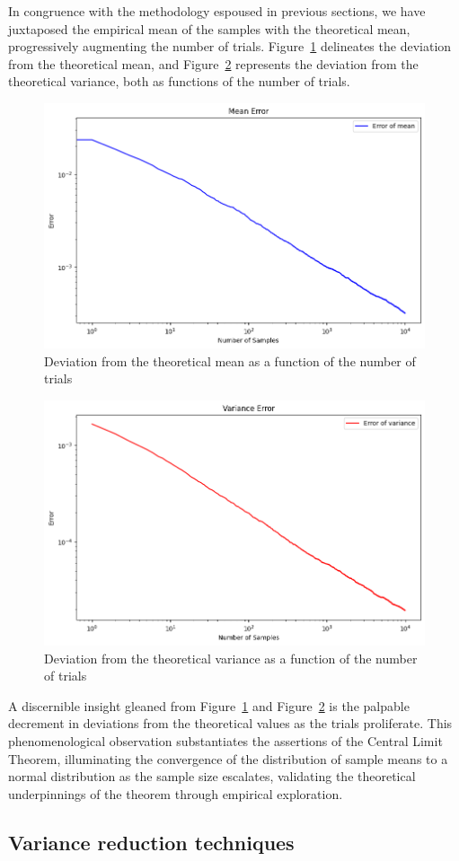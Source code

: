 \documentclass{article}
\begin{document}
In congruence with the methodology espoused in previous sections, we have juxtaposed the empirical mean of the samples with the theoretical mean, progressively augmenting the number of trials. Figure~\ref{fig:meanerror} delineates the deviation from the theoretical mean, and Figure~\ref{fig:varianceerror} represents the deviation from the theoretical variance, both as functions of the number of trials.

\begin{figure}[H]
	\centering
	\includegraphics[width=0.5\linewidth]{./Figures/CLT/meanerror.png}
	\caption{Deviation from the theoretical mean as a function of the number of trials}
	\label{fig:meanerror}
\end{figure}

\begin{figure}[H]
	\centering
	\includegraphics[width=0.5\linewidth]{./Figures/CLT/varianceerror.png}
	\caption{Deviation from the theoretical variance as a function of the number of trials}
	\label{fig:varianceerror}
\end{figure}

A discernible insight gleaned from Figure~\ref{fig:meanerror} and Figure~\ref{fig:varianceerror} is the palpable decrement in deviations from the theoretical values as the trials proliferate. This phenomenological observation substantiates the assertions of the Central Limit Theorem, illuminating the convergence of the distribution of sample means to a normal distribution as the sample size escalates, validating the theoretical underpinnings of the theorem through empirical exploration.

\subsection{Variance reduction techniques}
\end{document}
